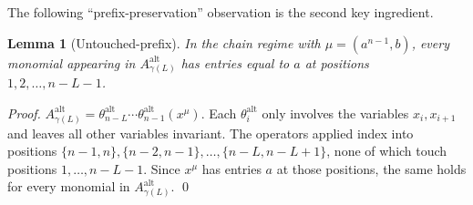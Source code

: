 \documentclass[11pt]{article}
\newtheorem{lemma}[theorem]{Lemma}
\newcommand{\Aalt}{A^{\mathrm{alt}}}
\newcommand{\thalt}{\theta^{\mathrm{alt}}}
\begin{document}
The following ``prefix-preservation'' observation is the second key ingredient.

\begin{lemma}[Untouched-prefix]\label{lem:prefix}
In the chain regime with $\mu = (a^{n-1}, b)$, every monomial appearing in
$\Aalt_{\gamma(L)}$ has entries equal to $a$ at positions $1, 2, \ldots, n-L-1$.
\end{lemma}

\begin{proof}
$\Aalt_{\gamma(L)} = \thalt_{n-L} \cdots \thalt_{n-1}(x^\mu)$.  Each
$\thalt_i$ only involves the variables $x_i, x_{i+1}$ and leaves all other
variables invariant.  The operators applied index into positions
$\{n-1, n\}, \{n-2, n-1\}, \ldots, \{n-L, n-L+1\}$, none of which touch
positions $1, \ldots, n-L-1$.  Since $x^\mu$ has entries $a$ at those
positions, the same holds for every monomial in $\Aalt_{\gamma(L)}$.
\qed
\end{proof}
\end{document}
